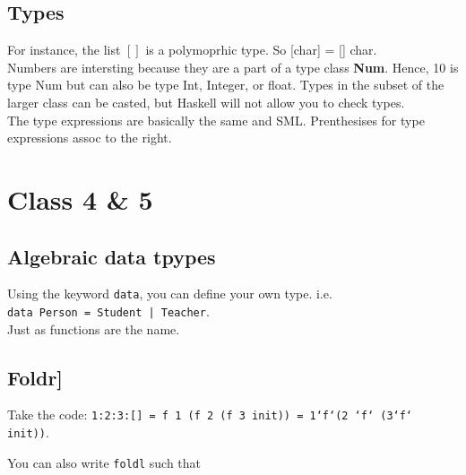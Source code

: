 \documentclass[12pt]{article}
\begin{document}
\subsection{Types}
For instance, the list $[]$ is a polymoprhic type. So [char] = [] char. \\

Numbers are intersting because they are a part of a type class \textbf{Num}. Hence, 10 is type Num but can also be type Int, Integer, or float. Types in the subset of the larger class can be casted, but Haskell will not allow you to check types.\\

The type expressions are basically the same and SML. Prenthesises for type expressions assoc to the right.

\section{Class 4 \& 5}
\subsection{Algebraic data tpypes}
Using the keyword {\tt data}, you can define your own type. i.e.\\
{\tt data Person = Student | Teacher}.\\
Just as functions are the name. \\
\subsection{Foldr]}
Take the code: {\tt 1:2:3:[] = f 1 (f 2 (f 3 init)) = 1`f`(2 `f` (3`f` init))}.

You can also write {\tt foldl} such that

\end{document}
